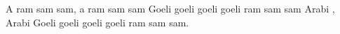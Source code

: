 \beginverse*
A ram sam sam, a ram sam sam
Goeli goeli goeli goeli
ram sam sam
Arabi , Arabi
Goeli goeli goeli goeli
ram sam sam.
\endverse
\endsong